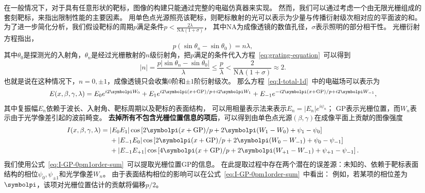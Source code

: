在一般情况下，对于具有任意形状的靶标，图像的构建只能通过完整的电磁仿真器来实现。
然而，我们可以通过考虑一个由无限光栅组成的套刻靶标，来指出限制性能的主要因素。
用单色点光源照亮该靶标，则靶标散射的光可以表示为少量与传播衍射级次相对应的平面波的和。
为了进一步简化分析，我们假设靶标的周期$p$满足条件$p<\frac{2\lambda}{\text{NA}(1+\sigma)}$，
其中NA为成像透镜的数值孔径，$\sigma$表示照明的部分相干性。
光栅衍射方程指出，
\begin{equation}\label{eq:grating-equation}
p(\sin\theta_n-\sin\theta_0)=n\lambda,
\end{equation}
其中$\theta_0$是探测光的入射角，$\theta_n$是经过光栅散射的$n$级衍射角，把$p$满足的条件代入方程~\eqref{eq:grating-equation}~可以得到
\begin{equation*}
|n|=\frac{p|\sin\theta_n-\sin\theta_0|}{\lambda}
\le\frac{p}{\lambda}<\frac{2}{\text{NA}(1+\sigma)}\approx2.
\end{equation*}
也就是说在这种情况下，$n=0,\pm1$，成像透镜只会收集0阶和$\pm1$阶衍射级次。
那么方程~\eqref{eq:I-total-1d}~中的电磁场可以表示为
\begin{equation}\label{eq:e-field-0pm1order-sum}
E(x,\beta,\gamma,\lambda) =
E_0e^{i2\symbolpi W_0} + E_1e^{i2\symbolpi(x+\text{GP})/p+i2\symbolpi W_1} +
E_{-1}e^{-i2\symbolpi(x+\text{GP})/p+i2\symbolpi W_{-1}},
\end{equation}
其中复振幅$E_n$依赖于波长、入射角、靶标周期以及靶标的表面结构，
可以用相量表示法来表示$E_n=|E_n|e^{i\psi_n}$；
GP表示光栅位置，而$W_n$表示由于光学像差引起的波前畸变。
\textbf{去掉所有不包含光栅位置信息的项后}，可以得到由单色点光源$(\beta,\gamma)$在成像平面上贡献的图像强度
\begin{equation}\label{eq:I-GP-0pm1order-sum}
\begin{aligned}
I(x,\beta,\gamma,\lambda) &= 
|E_0E_1|\cos\left[2\symbolpi(x+\text{GP})/p+2\symbolpi(W_1-W_0)+\psi_1-\psi_0\right] \\
&\quad~ + |E_{-1}E_0|\cos\left[2\symbolpi(x+\text{GP})/p+2\symbolpi(W_0-W_{-1})+\psi_0-\psi_{-1}\right] \\
&\quad~ + |E_{-1}E_{+1}|\cos\left[4\symbolpi(x+\text{GP})/p+2\symbolpi(W_{+1}-W_{-1})+\psi_{+1}-\psi_{-1}\right].
\end{aligned}
\end{equation}
我们使用公式~\eqref{eq:I-GP-0pm1order-sum}~可以提取光栅位置GP的信息。
在此提取过程中存在两个潜在的误差源：未知的、依赖于靶标表面结构的相位$\psi_0,\psi_{\pm1}$和光学像差$W_n$。
由于表面结构相位的影响可以在公式~\eqref{eq:I-GP-0pm1order-sum}~中看出：
例如，若某项的相位差为$\symbolpi$，该项对光栅位置估计的贡献将偏移$p/2$。
